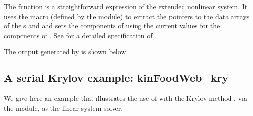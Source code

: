 The function  is a straightforward expression of the extended nonlinear 
system. It uses the macro  (defined by the {\nvecs} module)
to extract the pointers to the data arrays of the s  and 
and sets the components of  using the current values for the components
of .
See  for a detailed specification of .

The output generated by  is shown below.




\subsection{A serial Krylov example: kinFoodWeb\_kry}\label{ss:kinFoodWeb_kry}

We give here an example that illustrates the use of {\kinsol} with the Krylov
method {\spgmr}, via the {\sunlinsolspgmr} module, as the linear system solver.

